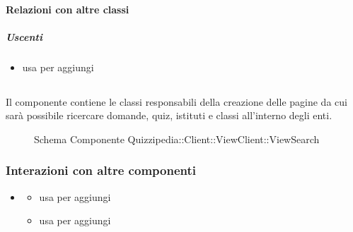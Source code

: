 \paragraph{Relazioni con altre classi}
\subparagraph{Uscenti}
\begin{itemize}
\item usa  per aggiungi
\end{itemize}
\subsection{}
Il componente contiene le classi responsabili della creazione delle pagine da cui sarà possibile ricercare domande, quiz, istituti e classi all'interno degli enti.
\begin{figure}[H]
\centering
\noindent{}
\caption[Schema Componente Quizzipedia::Client::ViewClient::ViewSearch]{Schema Componente Quizzipedia::Client::ViewClient::ViewSearch}
\end{figure}
\subsubsection{Interazioni con altre componenti}
\begin{itemize}
\item {}
\begin{itemize}
\item usa  per aggiungi
\item usa  per aggiungi
\end{itemize}
\end{itemize}
